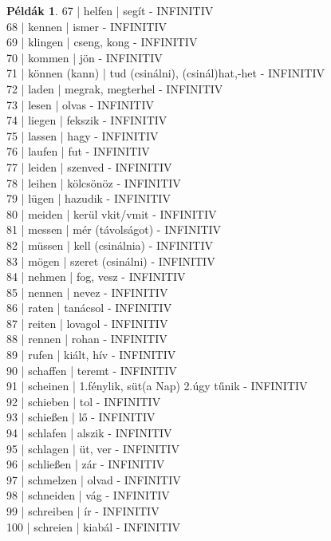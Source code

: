 \documentclass{article}
\theoremstyle{definition}
\newtheorem*{exmp}{Példák}
\begin{document}
\begin{exmp}
67 | helfen | segít - INFINITIV\\
68 | kennen | ismer - INFINITIV\\
69 | klingen | cseng, kong - INFINITIV\\
70 | kommen | jön - INFINITIV\\
71 | können (kann) | tud (csinálni), (csinál)hat,-het - INFINITIV\\
72 | laden | megrak, megterhel  - INFINITIV\\
73 | lesen | olvas - INFINITIV\\
74 | liegen | fekszik - INFINITIV\\
75 | lassen | hagy - INFINITIV\\
76 | laufen | fut - INFINITIV\\
77 | leiden | szenved - INFINITIV\\
78 | leihen | kölcsönöz - INFINITIV\\
79 | lügen | hazudik - INFINITIV\\
80 | meiden  | kerül vkit/vmit - INFINITIV\\
81 | messen | mér (távolságot) - INFINITIV\\
82 | müssen | kell (csinálnia) - INFINITIV\\
83 | mögen | szeret (csinálni) - INFINITIV\\
84 | nehmen | fog, vesz - INFINITIV\\
85 | nennen | nevez - INFINITIV\\
86 | raten | tanácsol - INFINITIV\\
87 | reiten | lovagol - INFINITIV\\
88 | rennen | rohan - INFINITIV\\
89 | rufen | kiált, hív - INFINITIV\\
90 | schaffen | teremt - INFINITIV\\
91 | scheinen | 1.fénylik, süt(a Nap) 2.úgy tűnik - INFINITIV\\
92 | schieben | tol - INFINITIV\\
93 | schießen | lő - INFINITIV\\
94 | schlafen | alszik - INFINITIV\\
95 | schlagen | üt, ver - INFINITIV\\
96 | schließen | zár - INFINITIV\\
97 | schmelzen | olvad - INFINITIV\\
98 | schneiden | vág - INFINITIV\\
99 | schreiben | ír - INFINITIV\\
100 | schreien | kiabál - INFINITIV\\

\end{exmp}
\end{document}
